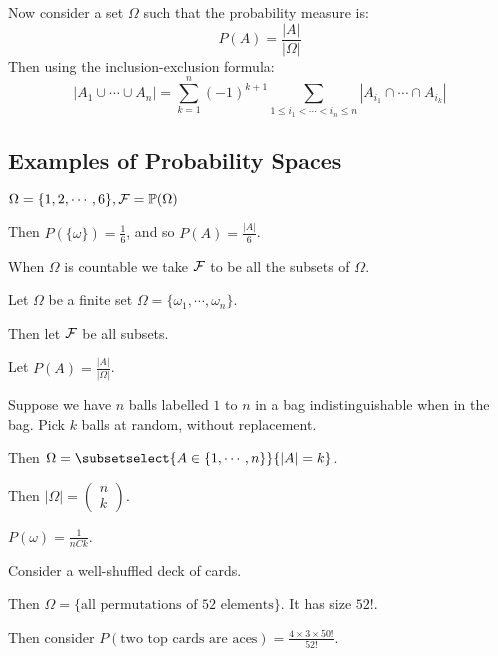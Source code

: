 \documentclass[../Main.tex]{subfiles}
\begin{document}
Now consider a set $\Omega$ such that the probability measure is:
\begin{equation*}
    P(A) = \frac{|A|}{|\Omega|}
\end{equation*}
Then using the inclusion-exclusion formula:
\begin{equation}
    |A_1 \cup \cdots \cup A_n| = \sum_{k=1}^{n} (-1)^{k+1} \sum_{1 \leq i_1 < \cdots < i_n \leq n} |A_{i_1} \cap \cdots \cap A_{i_k}|
    \label{eqnInclusionExclusionFiniteSets}
\end{equation}
\subsection{Examples of Probability Spaces}
\begin{example}
    $\Omega = \{1, 2, \cdots, 6\}, \mathcal{F} = \mathbb{P}(\Omega)$\par %
        Then $P(\{\omega\}) = \frac{1}{6}$, and so $P(A) = \frac{|A|}{6}$.
\end{example}
\begin{remark}
    When $\Omega$ is countable we take $\mathcal{F}$ to be all the subsets of $\Omega$.
\end{remark}
\begin{example}
    Let $\Omega$ be a finite set $\Omega = \{\omega_1, \cdots, \omega_n\}$.\par
    Then let $\mathcal{F}$ be all subsets.\par
    Let $P(A) = \frac{|A|}{|\Omega|}$.
\end{example}
\begin{example}
    Suppose we have $n$ balls labelled $1$ to $n$ in a bag indistinguishable when in the bag. Pick $k$ balls at random, without replacement.\par
    Then $\Omega = \subsetselect{A \in \{1, \cdots, n\}}{|A| = k}$.\par
    Then $|\Omega| = \begin{pmatrix}n \\ k\end{pmatrix}$.\par
    $P(\omega) = \frac{1}{nCk}$.
\end{example}
\begin{example}
    Consider a well-shuffled deck of cards.\par
    Then $\Omega = \{\text{all permutations of 52 elements}\}$. It has size $52!$.\par
    Then consider $P(\text{two top cards are aces}) = \frac{4 \times 3 \times 50!}{52!}$.
\end{example}
\end{document}
